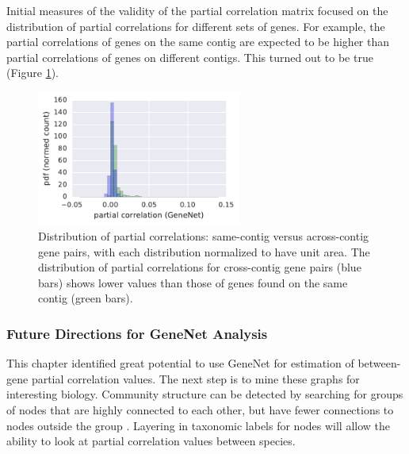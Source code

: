 Initial measures of the validity of the partial correlation matrix focused on the distribution of partial correlations for different sets of genes.
For example, the partial correlations of genes on the same contig are expected to be higher than partial correlations of genes on different contigs.
This turned out to be true (Figure \ref{fig:pcor_same_and_cross_contigs}).

\begin{figure}[H]
\centering
    \includegraphics[width=0.6\textwidth]{./tex/chapter3/figures/170407_same-contig_and_cross-contig_pcor_distributions.pdf}
    \begin{singlespace}
    \caption[Distribution of partial correlations: same-contig versus across-contig gene pairs]{
    	Distribution of partial correlations: same-contig versus across-contig gene pairs, with each distribution normalized to have unit area.
	The distribution of partial correlations for cross-contig gene pairs (blue bars) shows lower values than those of genes found on the same contig (green bars).
        }
    \label{fig:pcor_same_and_cross_contigs}
    \end{singlespace}
\end{figure}




\subsubsection{Future Directions for GeneNet Analysis}

This chapter identified great potential to use GeneNet for estimation of between-gene partial correlation values.
The next step is to mine these graphs for interesting biology.
Community structure can be detected by searching for groups of nodes that are highly connected to each other, but have fewer connections to nodes outside the group \cite{girvan2002}.
Layering in taxonomic labels for nodes will allow the ability to look at partial correlation values between species.


